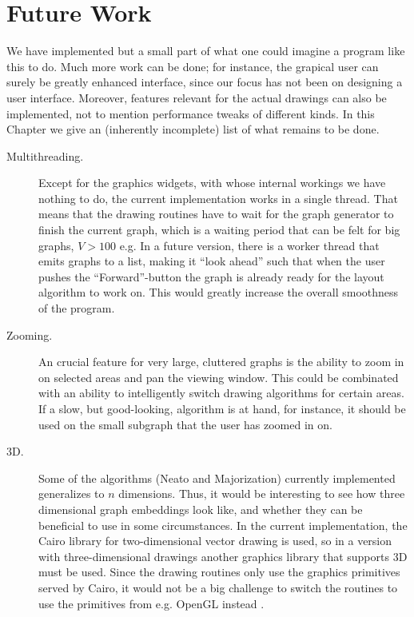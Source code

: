 
\chapter{Future Work}

We have implemented but a small part of what one could imagine a program like
this to do. Much more work can be done; for instance, the grapical user can
surely be greatly enhanced interface, since our focus has not been on
designing a user interface. Moreover, features relevant for the actual
drawings can also be implemented, not to mention performance tweaks of
different kinds. In this Chapter we give an (inherently incomplete) list of
what remains to be done.

\begin{description}
	\item[Multithreading.] Except for the graphics widgets, with whose internal workings 
	we have
	nothing to do, the current implementation works in a single thread. That means
	that the drawing routines have to wait for the graph generator to finish the
	current graph, which is a waiting period that can be felt for big graphs, $V>100$ e.g.
	In a future version, there is a worker thread that emits graphs to a list, making 
	it ``look ahead'' such that when the user pushes the ``Forward''-button the graph
	is already ready for the layout algorithm to work on. This would greatly increase
	the overall smoothness of the program. 
	
	\item[Zooming.] An crucial feature for very large, cluttered graphs is the
	ability to zoom in on selected areas and pan the viewing window. This could be combinated
	with an ability to intelligently switch drawing algorithms for certain areas. 
	If a slow, but good-looking, algorithm is at hand, for instance, it should be used
	on the small subgraph that the user has zoomed in on. 
	
	\item[3D.] Some of the algorithms (Neato and Majorization) currently implemented generalizes to 
	$n$ dimensions. Thus, it would be interesting to see how three dimensional 
	graph embeddings look like, and whether they can be beneficial to use in some
	circumstances. In the current implementation, the Cairo library for two-dimensional
	vector drawing is used, so in a version with three-dimensional drawings another
	graphics library that supports 3D must be used. Since the drawing routines 
	only use the graphics primitives served by Cairo, it would not be a big challenge
	to switch the routines to use the primitives from e.g. OpenGL instead \cite{OpenGL}.
	

\end{description}
